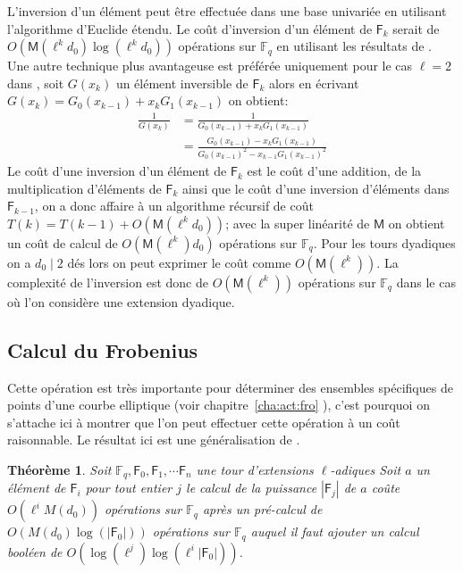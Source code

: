 \documentclass[10pt,a4paper]{book}
\theoremstyle{plain}
\newtheorem{thm}{Théorème}[chapter]
\theoremstyle{definition}
\theoremstyle{definition}
\theoremstyle{definition}
\theoremstyle{definition}
\theoremstyle{remark}
\theoremstyle{remark}
\theoremstyle{definition}
\begin{document}
L'inversion d'un élément peut être effectuée dans une base univariée en utilisant l'algorithme d'Euclide étendu. Le coût d'inversion d'un élément de $\mathsf{F}_k$ serait de $O(\mathsf{M}(\ell^kd_0)\log(\ell^kd_0))$ opérations sur $\mathbb{F}_q$ en utilisant les résultats de \cite[ch.11]{vzGJG03}. Une autre technique plus avantageuse est préférée uniquement pour le cas $\ell=2$ dans \cite{Doliskani-Schost15}, soit $G(x_k)$ un élément inversible de $\mathsf{F}_k$ alors en écrivant $G(x_k)=G_0(x_{k-1})+x_kG_1(x_{k-1})$ on obtient:
\begin{align*}
\frac{1}{G(x_k)} &=\frac{1}{G_0(x_{k-1})+x_kG_1(x_{k-1})} \\
 				&= \frac{G_0(x_{k-1})-x_kG_1(x_{k-1})}{G_0(x_{k-1})^2-x_{k-1}G_1(x_{k-1})^2}
\end{align*}
Le coût d'une inversion d'un élément de $\mathsf{F}_k$ est le coût d'une addition, de la multiplication d'éléments de $\mathsf{F}_k$ ainsi que le coût d'une inversion d'éléments dans $\mathsf{F}_{k-1}$, on a donc affaire à un algorithme récursif de coût  $T(k)=T(k-1)+O(\mathsf{M}(\ell^kd_0))$; avec la super linéarité de $\mathsf{M}$ on obtient un coût de calcul de $O(\mathsf{M}(\ell^k)d_0)$ opérations sur $\mathbb{F}_q$. Pour les tours dyadiques on a $d_0 \mid 2$ dés lors on peut exprimer le coût comme $O(\mathsf{M}(\ell^k))$. La complexité de l'inversion est donc de $O(\mathsf{M}(\ell^k))$ opérations sur $\mathbb{F}_q$ dans le cas où l'on considère une extension dyadique.

\subsection*{Calcul du Frobenius}

Cette opération est très importante pour déterminer des ensembles spécifiques de points d'une courbe elliptique (voir chapitre~\ref{cha:act:fro} ), c'est pourquoi on s'attache ici à montrer que l'on peut effectuer cette opération à un coût raisonnable. Le résultat ici est une généralisation de \cite{Doliskani-Schost15}.

\begin{thm} \label{thm:frob-ell}
Soit $\mathbb{F}_q, \mathsf{F}_0, \mathsf{F}_1,  \cdots \mathsf{F}_n$ une tour d'extensions $\ell$-adiques
Soit $a$ un élément de $\mathsf{F}_i$ pour tout entier $j$ le calcul de la puissance $|\mathsf{F}_j|$ de $a$ coûte
 $O(\ell^{i}M(d_0))$ opérations sur $\mathbb{F}_q$ après un pré-calcul de $O( M(d_0)\log(|\mathsf{F}_0|))$ opérations sur $\mathbb{F}_q$
auquel il faut ajouter un calcul booléen de $O(\log(\ell^j)\log(\ell^i|\mathsf{F}_0|))$.
\end{thm} 
\end{document}
